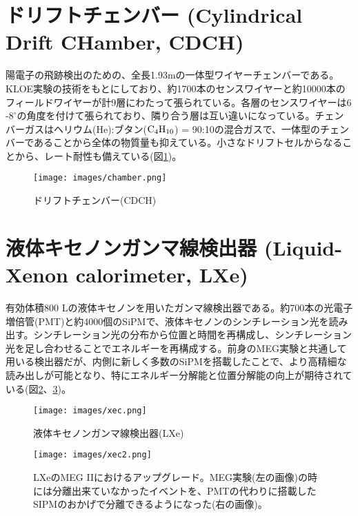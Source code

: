 \documentclass[Yonemoto_master.tex]{subfiles}
\begin{document}
\section{ドリフトチェンバー (Cylindrical Drift CHamber, CDCH)}
\label{sec: cdch}
陽電子の飛跡検出のための、全長1.93mの一体型ワイヤーチェンバーである。KLOE実験の技術をもとにしており\cite{KLOE}、約1700本のセンスワイヤーと約10000本のフィールドワイヤーが計9層にわたって張られている。各層のセンスワイヤーは$6$-$8^\circ$の角度を付けて張られており、隣り合う層は互い違いになっている。チェンバーガスはヘリウム(He):ブタン(${\rm C_4 H_{10}}$) = 90:10の混合ガスで、一体型のチェンバーであることから全体の物質量も抑えている。小さなドリフトセルからなることから、レート耐性も備えている(図\ref{fig: CDCH})。
\begin{figure}[h]
\begin{center}
\texttt{[image: images/chamber.png]}
\caption{ドリフトチェンバー(CDCH)}
\label{fig: CDCH}
\end{center}
\end{figure}

\section{液体キセノンガンマ線検出器 (Liquid-Xenon calorimeter, LXe)}
\label{sec: xec}
有効体積800 Lの液体キセノンを用いたガンマ線検出器である。約700本の光電子増倍管(PMT)と約4000個のSiPMで、液体キセノンのシンチレーション光を読み出す。シンチレーション光の分布から位置と時間を再構成し、シンチレーション光を足し合わせることでエネルギーを再構成する。前身のMEG実験と共通して用いる検出器だが、内側に新しく多数のSiPMを搭載したことで、より高精細な読み出しが可能となり、特にエネルギー分解能と位置分解能の向上が期待されている(図\ref{fig: LXe1}、\ref{fig: LXe2})。
\begin{figure}[h]
\begin{center}
\texttt{[image: images/xec.png]}
\caption{液体キセノンガンマ線検出器(LXe)}
\label{fig: LXe1}
\end{center}
\end{figure}
\begin{figure}[h]
\begin{center}
\texttt{[image: images/xec2.png]}
\caption{LXeのMEG IIにおけるアップグレード。MEG実験(左の画像)の時には分離出来ていなかったイベントを、PMTの代わりに搭載したSIPMのおかげで分離できるようになった(右の画像)。}
\label{fig: LXe2}
\end{center}
\end{figure}
\end{document}
